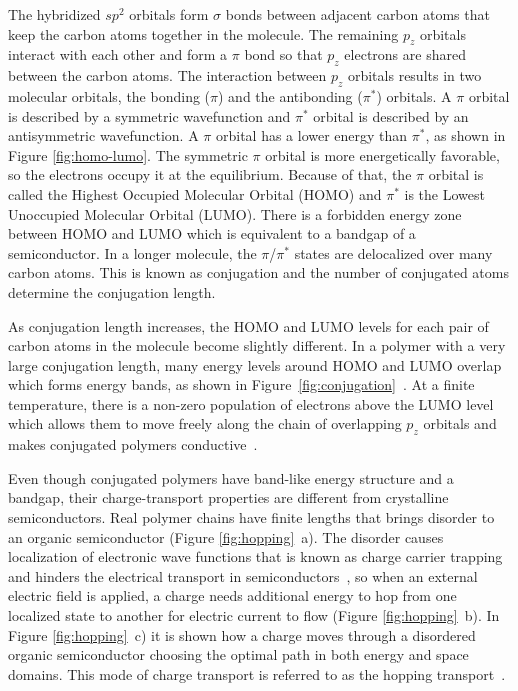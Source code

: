 The hybridized $sp^2$ orbitals form $\sigma$ bonds between adjacent carbon atoms that keep the carbon atoms together in the molecule. The remaining $p_z$ orbitals interact with each other and form a $\pi$ bond so that $p_z$ electrons are shared between the carbon atoms. The interaction between $p_z$ orbitals results in two molecular orbitals, the bonding ($\pi$) and the antibonding ($\pi^*$) orbitals. A $\pi$ orbital is described by a symmetric wavefunction and $\pi^*$ orbital is described by an antisymmetric wavefunction. A $\pi$ orbital has a lower energy than $\pi^*$, as shown in Figure \ref{fig:homo-lumo}. The symmetric $\pi$ orbital is more energetically favorable, so the electrons occupy it at the equilibrium. Because of that, the $\pi$ orbital is called the Highest Occupied Molecular Orbital (HOMO) and $\pi^*$ is the Lowest Unoccupied Molecular Orbital (LUMO). There is a forbidden energy zone between HOMO and LUMO which is equivalent to a bandgap of a semiconductor. In a longer molecule, the $\pi$/$\pi^*$ states are delocalized over many carbon atoms. This is known as conjugation and the number of conjugated atoms determine the conjugation length.\\
\par As conjugation length increases, the HOMO and LUMO levels for each pair of carbon atoms in the molecule become slightly different. In a polymer with a very large conjugation length, many energy levels around HOMO and LUMO overlap which forms energy bands, as shown in Figure~\ref{fig:conjugation}~\cite{Koehler_book,cambridge}. At a finite temperature, there is a non-zero population of electrons above the LUMO level which allows them to move freely along the chain of overlapping $p_z$ orbitals and makes conjugated polymers conductive~\cite{heeger_polymers}.\\

\par Even though conjugated polymers have band-like energy structure and a bandgap, their charge-transport properties are different from crystalline semiconductors. Real polymer chains have finite lengths that brings disorder to an organic semiconductor (Figure \ref{fig:hopping}~a). The disorder causes localization of electronic wave functions that is known as charge carrier trapping and hinders the electrical transport in semiconductors~\cite{Yi2016,Meier2013}, so when an external electric field is applied, a charge needs additional energy to hop from one localized state to another for electric current to flow (Figure \ref{fig:hopping}~b). In Figure \ref{fig:hopping}~c) it is shown how a charge moves through a disordered organic semiconductor choosing the optimal path in both energy and space domains. This mode of charge transport is referred to as the hopping transport~\cite{Tessler2009}.\\

